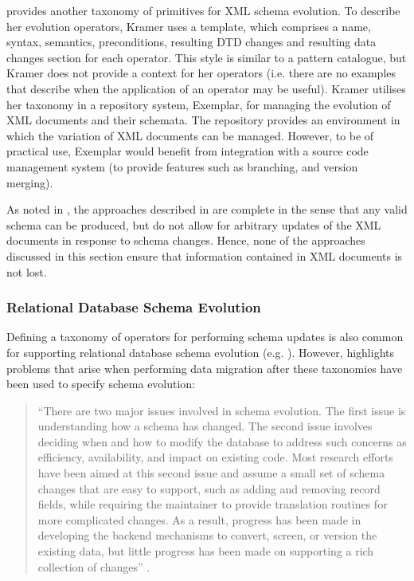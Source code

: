 \cite{kramer01xem} provides another taxonomy of primitives for XML schema evolution. To describe her evolution operators, Kramer uses a template, which comprises a name, syntax, semantics, preconditions, resulting DTD changes and resulting data changes section for each operator. This style is similar to a pattern catalogue, but Kramer does not provide a context for her operators (i.e. there are no examples that describe when the application of an operator may be useful). Kramer utilises her taxonomy in a repository system, Exemplar, for managing the evolution of XML documents and their schemata. The repository provides an environment in which the variation of XML documents can be managed. However, to be of practical use, Exemplar would benefit from integration with a source code management system (to provide features such as branching, and version merging).

As noted in \cite{pizka07automating}, the approaches described in \cite{kramer01xem,su01xem,guerrini05impact} are complete in the sense that any valid schema can be produced, but do not allow for arbitrary updates of the XML documents in response to schema changes. Hence, none of the approaches discussed in this section ensure that information contained in XML documents is not lost.


\subsubsection{Relational Database Schema Evolution}
\label{LitReview:RdbsSchemaEvo}
Defining a taxonomy of operators for performing schema updates is also common for supporting relational database schema evolution (e.g. \cite{edelweiss05temporal,banerjee87semantics}). However, \cite{lerner00model} highlights problems that arise when performing data migration after these taxonomies have been used to specify schema evolution:

 \begin{quote}
 ``There are two major issues involved in schema evolution. The first issue is understanding how a schema has changed. The second issue involves deciding when and how to modify the database to address such concerns as efficiency, availability, and impact on existing code. Most research efforts have been aimed at this second issue and assume a small set of schema changes that are easy to support, such as adding and removing record fields, while requiring the maintainer to provide translation routines for more complicated changes. As a result, progress has been made in developing the backend mechanisms to convert, screen, or version the existing data, but little progress has been made on supporting a rich collection of changes'' \cite[pg. 84]{lerner00model}.
 \end{quote}

